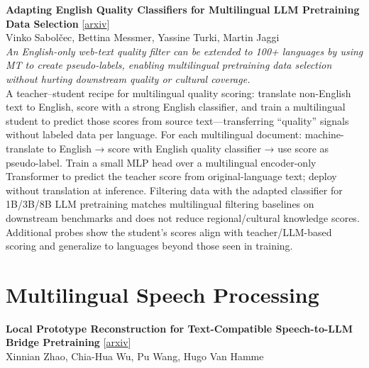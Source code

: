 \documentclass[12pt,letterpaper]{article}
\begin{document}
\medskip

{\small\textbf{Adapting English Quality Classifiers for Multilingual LLM Pretraining Data Selection}} {\scriptsize[\href{https://arxiv.org/abs/2610.11585}{arxiv}]}\\
{\scriptsize Vinko Sabolčec, Bettina Messmer, Yassine Turki, Martin Jaggi}\\

{\small\textit{An English-only web-text quality filter can be extended to 100+ languages by using MT to create pseudo-labels, enabling multilingual pretraining data selection without hurting downstream quality or cultural coverage.}}\\[1pt]
{\footnotesize A teacher--student recipe for multilingual quality scoring: translate non-English text to English, score with a strong English classifier, and train a multilingual student to predict those scores from source text---transferring ``quality'' signals without labeled data per language. For each multilingual document: machine-translate to English → score with English quality classifier → use score as pseudo-label. Train a small MLP head over a multilingual encoder-only Transformer to predict the teacher score from original-language text; deploy without translation at inference. Filtering data with the adapted classifier for 1B/3B/8B LLM pretraining matches multilingual filtering baselines on downstream benchmarks and does not reduce regional/cultural knowledge scores. Additional probes show the student's scores align with teacher/LLM-based scoring and generalize to languages beyond those seen in training.}

\medskip


\section*{Multilingual Speech Processing}

{\small\textbf{Local Prototype Reconstruction for Text-Compatible Speech-to-LLM Bridge Pretraining}} {\scriptsize[\href{https://arxiv.org/abs/2610.11159}{arxiv}]}\\
{\scriptsize Xinnian Zhao, Chia-Hua Wu, Pu Wang, Hugo Van Hamme}\\
\end{document}

